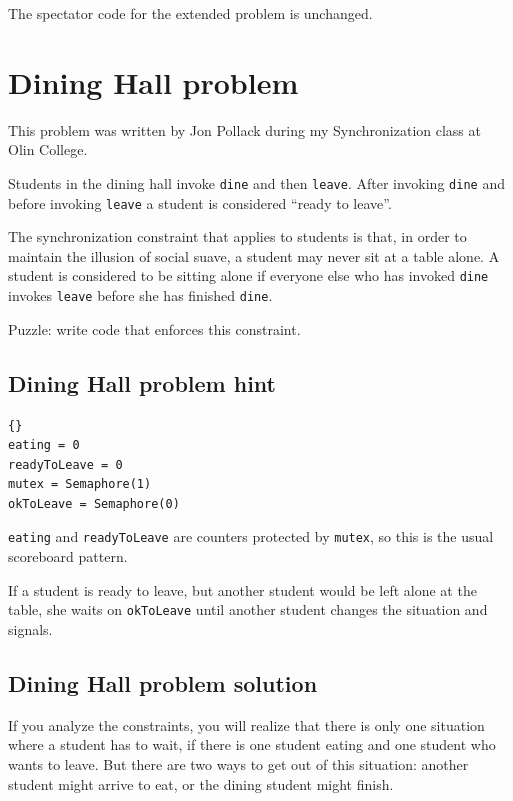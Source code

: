 \documentclass{book}
\newcommand{\clearemptydoublepage}{\newpage\cleardoublepage}
\begin{document}
The spectator code for the extended problem is unchanged.


\clearemptydoublepage
\section{Dining Hall problem}

This problem was written by Jon Pollack during my Synchronization
class at Olin College.  

Students in the dining hall invoke {\tt dine} and then {\tt leave}.
After invoking {\tt dine} and before invoking {\tt leave} a student is
considered ``ready to leave''.

The synchronization constraint that applies to students is that, in
order to maintain the illusion of social suave, a student may never
sit at a table alone.  A student is considered to be sitting alone
if everyone else who has invoked {\tt dine} invokes {\tt leave}
before she has finished {\tt dine}.

Puzzle: write code that enforces this constraint.


\clearemptydoublepage
\subsection {Dining Hall problem hint}

\begin{lstlisting}[title={Dining Hall problem hint}]{}
eating = 0
readyToLeave = 0
mutex = Semaphore(1)
okToLeave = Semaphore(0)
\end{lstlisting}

{\tt eating} and {\tt readyToLeave} are
counters protected by {\tt mutex}, so this is the usual
scoreboard pattern.

If a student is ready to leave, but another student would be
left alone at the table, she waits on
{\tt okToLeave} until another student changes
the situation and signals.


\clearemptydoublepage
\subsection {Dining Hall problem solution}

If you analyze the constraints, you will realize that there
is only one situation where a student has to wait, if there is
one student eating and one student who wants to leave.  But
there are two ways to get out of this situation: another
student might arrive to eat, or the dining student might 
finish.
\end{document}
